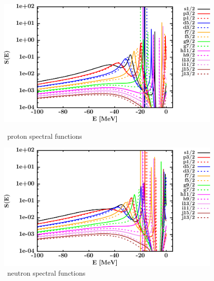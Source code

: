 \begin{figure}[hbtp]
    \centering
    \begin{minipage}{0.42\textwidth}
        \centering
        \includegraphics[width=\textwidth]{figures/pb208_protonSpectralFunctions.png}
        \caption*{\pbEight\ proton spectral functions}
        \label{DOMFitData_pb208_proton_spectralFunctions}
    \end{minipage}\hspace{6pt}
    \begin{minipage}{0.42\textwidth}
        \centering
        \includegraphics[width=\linewidth]{figures/pb208_neutronSpectralFunctions.png}
        \caption*{\pbEight\ neutron spectral functions}
        \label{DOMFitData_pb208_neutron_spectralFunctions}
    \end{minipage}
\end{figure}
